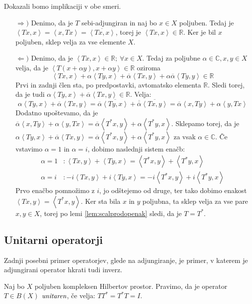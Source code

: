 \documentclass[mat2]{matdelo}
\newcommand{\R}{\mathbb{R}}
\newcommand{\C}{\mathbb{C}}
\newcommand{\pojem}[1]{\ensuremath{\emph{#1}}}
\newcommand{\Sp}[2]{\ensuremath{\left<#1, #2\right>}}
\begin{document}
			\begin{dokaz}
				Dokazali bomo implikaciji v obe smeri.
				\begin{itemize}
					\item[$\Rightarrow)$] Denimo, da je $T$ sebi-adjungiran in naj bo $x\in X$ poljuben. Tedaj je $\Sp{Tx}{x} = \Sp{x}{Tx} = \overline{\Sp{Tx}{x}}$, torej je $\Sp{Tx}{x}\in \R$. Ker je bil $x$ poljuben, sklep velja za vse elemente $X$.
					\item[$\Leftarrow)$] Denimo, da je $\Sp{Tx}{x}\in\R;~\forall x\in X$. Tedaj za poljubne $\alpha\in\C, x, y\in X$ velja, da je $\Sp{T(x + \alpha y)}{x + \alpha y}\in \R$ oziroma $$\Sp{Tx}{x} + \alpha\Sp{Ty}{x} + \overline{\alpha}\Sp{Tx}{y} + \alpha\overline{\alpha}\Sp{Ty}{y}\in\R$$
					Prvi in zadnji člen sta, po predpostavki, avtomatsko elementa $\R$. Sledi torej, da je tudi $\alpha\Sp{Ty}{x} + \overline{\alpha}\Sp{Tx}{y}\in\R$. Velja: $$\alpha\Sp{Ty}{x} + \overline{\alpha}\Sp{Tx}{y} = \overline{\alpha}\overline{\Sp{Ty}{x}} + \overline{\overline{\alpha}}\overline{\Sp{Tx}{y}} = \overline{\alpha}\Sp{x}{Ty} + \alpha\Sp{y}{Tx}$$
					Dodatno upoštevamo, da je $\overline{\alpha}\Sp{x}{Ty} + \alpha\Sp{y}{Tx} = \overline{\alpha}\Sp{T^*x}{y} + \alpha\Sp{T^*y}{x}$. Sklepamo torej, da je $\alpha\Sp{Ty}{x} + \overline{\alpha}\Sp{Tx}{y}=\overline{\alpha}\Sp{T^*x}{y} + \alpha\Sp{T^*y}{x}$ za vsak $\alpha\in\C$. Če vstavimo $\alpha = 1$ in $\alpha = i$, dobimo naslednji sistem enačb: \begin{align*}
						\alpha = 1&:\Sp{Tx}{y} + \Sp{Ty}{x} = \Sp{T^*x}{y} + \Sp{T^*y}{x} \\
						\alpha = i&:-i\Sp{Tx}{y} + i\Sp{Ty}{x} = -i\Sp{T^*x}{y} + i\Sp{T^*y}{x}
					\end{align*}
					Prvo enačbo pomnožimo z $i$, jo odštejemo od druge, ter tako dobimo enakost $\Sp{Tx}{y} = \Sp{T^*x}{y}$. Ker sta bila $x$ in $y$ poljubna, ta sklep velja za vse pare $x, y \in X$, torej po lemi \ref{lem:scalprodopenak} sledi, da je $T = T^*$.
				\end{itemize}	
			\end{dokaz}
			
			\subsection{Unitarni operatorji}
			
			Zadnji posebni primer operatorjev, glede na adjungiranje, je primer, v katerem je adjungirani operator hkrati tudi inverz.
			
			\begin{definicija}
				\label{def:unitarop}
				Naj bo $X$ poljuben kompleksen Hilbertov prostor. Pravimo, da je operator $T\in B(X)$ \pojem{unitaren}, če velja: $TT^* = T^*T = I$.
			\end{definicija}
			
\end{document}
